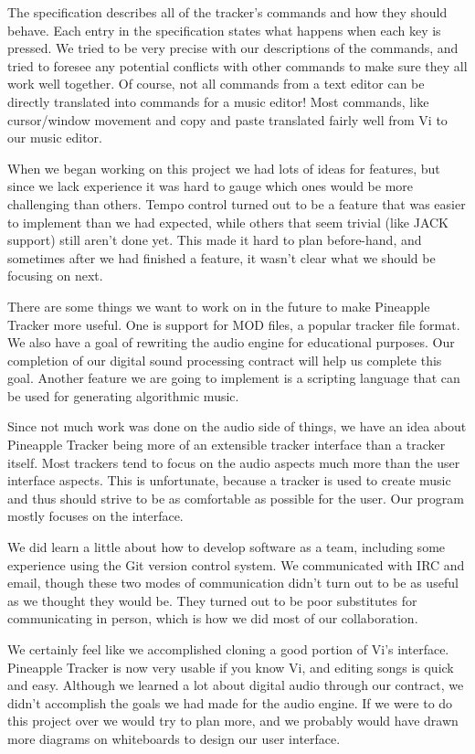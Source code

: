\documentclass[12pt,letterpaper]{article}
\begin{document}
\par
The specification describes all of the tracker's commands and how they should behave.
Each entry in the specification states what happens when each key is pressed.
We tried to be very precise with our descriptions of the commands, and tried to foresee any potential conflicts with other commands to make sure they all work well together.
Of course, not all commands from a text editor can be directly translated into commands for a music editor!
Most commands, like cursor/window movement and copy and paste translated fairly well from Vi to our music editor.

\par
When we began working on this project we had lots of ideas for features, but since we lack experience it was hard to gauge which ones would be more challenging than others.
Tempo control turned out to be a feature that was easier to implement than we had expected, while others that seem trivial (like JACK support) still aren't done yet.
This made it hard to plan before-hand, and sometimes after we had finished a feature, it wasn't clear what we should be focusing on next.

\par
There are some things we want to work on in the future to make Pineapple Tracker more useful.
One is support for MOD files, a popular tracker file format.
We also have a goal of rewriting the audio engine for educational purposes.
Our completion of our digital sound processing contract will help us complete this goal.
Another feature we are going to implement is a scripting language that can be used for generating algorithmic music.

\par
Since not much work was done on the audio side of things, we have an idea about Pineapple Tracker being more of an extensible tracker interface than a tracker itself. 
Most trackers tend to focus on the audio aspects much more than the user interface aspects.
This is unfortunate, because a tracker is used to create music and thus should strive to be as comfortable as possible for the user.
Our program mostly focuses on the interface.

\par
We did learn a little about how to develop software as a team, including some experience using the Git version control system.
We communicated with IRC and email, though these two modes of communication didn't turn out to be as useful as we thought they would be.
They turned out to be poor substitutes for communicating in person, which is how we did most of our collaboration.

\par
We certainly feel like we accomplished cloning a good portion of Vi's interface.
Pineapple Tracker is now very usable if you know Vi, and editing songs is quick and easy.
Although we learned a lot about digital audio through our contract, we didn't accomplish the goals we had made for the audio engine.
If we were to do this project over we would try to plan more, and we probably would have drawn more diagrams on whiteboards to design our user interface.
\end{document}

